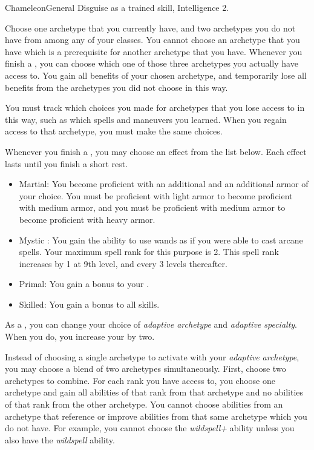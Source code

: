     \begin{feat}{Chameleon}{General}
        \featpre Disguise as a trained skill, Intelligence 2.

         Choose one archetype that you currently have, and two archetypes you do not have from among any of your classes.
        You cannot choose an archetype that you have which is a prerequisite for another archetype that you have.
        Whenever you finish a , you can choose which one of those three archetypes you actually have access to.
        You gain all benefits of your chosen archetype, and temporarily lose all benefits from the archetypes you did not choose in this way.

        You must track which choices you made for archetypes that you lose access to in this way, such as which spells and maneuvers you learned.
        When you regain access to that archetype, you must make the same choices.

         Whenever you finish a , you may choose an effect from the list below.
        Each effect lasts until you finish a short rest.
        \begin{itemize}
            \item Martial: You become proficient with an additional  and an additional armor  of your choice.
                You must be proficient with light armor to become proficient with medium armor, and you must be proficient with medium armor to become proficient with heavy armor.
            \item Mystic \sparkle: You gain the ability to use wands as if you were able to cast arcane spells.
                Your maximum spell rank for this purpose is 2.
                This spell rank increases by 1 at 9th level, and every 3 levels thereafter.
            \item Primal: You gain a  bonus to your .
            \item Skilled: You gain a  bonus to all skills.
        \end{itemize}

         As a , you can change your choice of \textit{adaptive archetype} and \textit{adaptive specialty}.
        When you do, you increase your  by two.

         Instead of choosing a single archetype to activate with your \textit{adaptive archetype}, you may choose a blend of two archetypes simultaneously.
        First, choose two archetypes to combine.
        For each rank you have access to, you choose one archetype and gain all abilities of that rank from that archetype and no abilities of that rank from the other archetype.
        You cannot choose abilities from an archetype that reference or improve abilities from that same archetype which you do not have.
        For example, you cannot choose the \textit{wildspell+} ability unless you also have the \textit{wildspell} ability.


\end{feat}
